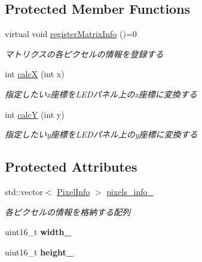 \subsection*{Protected Member Functions}
\begin{DoxyCompactItemize}
\item 
\mbox{\label{classPanelBase_a93b3be0e1305053c49d41e60e5bcd95c}} 
virtual void \hyperlink{classPanelBase_a93b3be0e1305053c49d41e60e5bcd95c}{register\+Matrix\+Info} ()=0
\begin{DoxyCompactList}\small\item\em マトリクスの各ピクセルの情報を登録する \end{DoxyCompactList}\item 
\mbox{\label{classPanelBase_a4f9d7f1571a34a91574f078e5be49826}} 
int \hyperlink{classPanelBase_a4f9d7f1571a34a91574f078e5be49826}{calcX} (int x)
\begin{DoxyCompactList}\small\item\em 指定したいx座標を\+L\+E\+Dパネル上のx座標に変換する \end{DoxyCompactList}\item 
\mbox{\label{classPanelBase_a0d128c31d63506c90d2d103a07ef5ac9}} 
int \hyperlink{classPanelBase_a0d128c31d63506c90d2d103a07ef5ac9}{calcY} (int y)
\begin{DoxyCompactList}\small\item\em 指定したいy座標を\+L\+E\+Dパネル上のy座標に変換する \end{DoxyCompactList}\end{DoxyCompactItemize}
\subsection*{Protected Attributes}
\begin{DoxyCompactItemize}
\item 
\mbox{\label{classPanelBase_a2bd215863e490bf3d5e53f97ae1268fd}} 
std\+::vector$<$ \hyperlink{structPixelInfo}{Pixel\+Info} $>$ \hyperlink{classPanelBase_a2bd215863e490bf3d5e53f97ae1268fd}{pixels\+\_\+info\+\_\+}
\begin{DoxyCompactList}\small\item\em 各ピクセルの情報を格納する配列 \end{DoxyCompactList}\item 
\mbox{\label{classPanelBase_a46af10a6ac5867c26b5ae13406f7c710}} 
uint16\+\_\+t {\bfseries width\+\_\+}
\item 
\mbox{\label{classPanelBase_a11f4802767a6e7954ff6e288cf94d21d}} 
uint16\+\_\+t {\bfseries height\+\_\+}
\end{DoxyCompactItemize}


